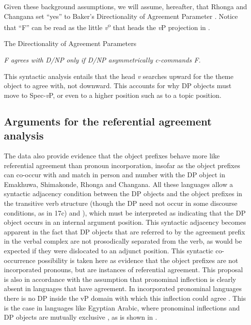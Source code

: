 \documentclass[output=paper]{langsci/langscibook}
\begin{document}
Given these background assumptions, we will assume, hereafter, that Rhonga and Changana set “yes” to Baker’s Directionality of Agreement Parameter . Notice that “F” can be read as the little \textit{v}\textsuperscript{o} that heads the {\textit{v}}P projection in .

\ea\label{ex:nguna:23}
{The Directionality of Agreement Parameters \citep[155]{Baker2008}}

{\textit{F agrees with D/NP only if D/NP asymmetrically c-commands F.}}
\z

This syntactic analysis entails that the head {\textit{v}} searches upward for the theme object to agree with, not downward. This accounts for why DP objects must move to Spec-{\textit{v}}P, or even to a higher position such as to a topic position.

\subsection{Arguments for the referential agreement analysis}

The data also provide evidence that the object prefixes behave more like referential agreement than pronoun incorporation, insofar as the object prefixes can co-occur with and match in person and number with the DP object in Emakhuwa, Shimakonde, Rhonga and Changana. All these languages allow a syntactic adjacency condition between the DP objects and the object prefixes in the transitive verb structure (though the DP need not occur in some discourse conditions, as in 17c) and ), which must be interpreted as indicating that the DP object occurs in an internal argument position. This syntactic adjacency becomes apparent in the fact that DP objects that are referred to by the agreement prefix in the verbal complex are not prosodically separated from the verb, as would be expected if they were dislocated to an adjunct position. This syntactic co-occurrence possibility is taken here as evidence that the object prefixes are not incorporated pronouns, but are instances of referential agreement. This proposal is also in accordance with the assumption that pronominal inflection is clearly absent in languages that have agreement. In incorporated pronominal languages there is no DP inside the vP domain with which this inflection could agree \citep{Jelinek1989}. This is the case in languages like Egyptian Arabic, where pronominal inflections and DP objects are mutually exclusive \citep{Jelinek1989}, as is shown in .
\end{document}
